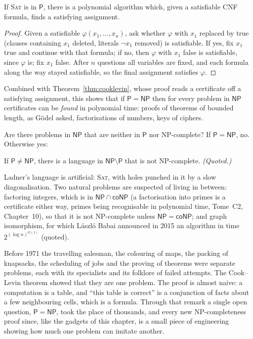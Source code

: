 \begin{proposition}\label{prop:selfreduce}
If \textup{\textsc{Sat}} is in $\mathsf P$, there is a polynomial algorithm which, given a satisfiable CNF formula, finds a satisfying assignment.
\end{proposition}

\begin{proof}
Given a satisfiable $\varphi(x_1,\dots,x_n)$, ask whether $\varphi$ with $x_1$ replaced by true (clauses containing $x_1$ deleted, literals $\neg x_1$ removed) is satisfiable. If yes, fix $x_1$ true and continue with that formula; if no, then $\varphi$ with $x_1$ false is satisfiable, since $\varphi$ is; fix $x_1$ false. After $n$ questions all variables are fixed, and each formula along the way stayed satisfiable, so the final assignment satisfies $\varphi$.
\end{proof}

Combined with Theorem~\ref{thm:cooklevin}, whose proof reads a certificate off a satisfying assignment, this shows that if $\mathsf P=\mathsf{NP}$ then for every problem in $\mathsf{NP}$ certificates can be \emph{found} in polynomial time: proofs of theorems of bounded length, as Gödel asked, factorisations of numbers, keys of ciphers.

Are there problems in $\mathsf{NP}$ that are neither in $\mathsf P$ nor NP-complete? If $\mathsf P=\mathsf{NP}$, no. Otherwise yes:

\begin{theorem}[Ladner 1975]\label{thm:ladner}
If $\mathsf P\ne\mathsf{NP}$, there is a language in $\mathsf{NP}\setminus\mathsf P$ that is not NP-complete. \emph{(Quoted.)}
\end{theorem}

Ladner's language is artificial: \textup{\textsc{Sat}}, with holes punched in it by a slow diagonalisation. Two natural problems are suspected of living in between: factoring integers, which is in $\mathsf{NP}\cap\mathsf{coNP}$ (a factorisation into primes is a certificate either way, primes being recognisable in polynomial time, Tome~C2, Chapter~10), so that it is not NP-complete unless $\mathsf{NP}=\mathsf{coNP}$; and graph isomorphism, for which László Babai announced in 2015 an algorithm in time $2^{(\log n)^{O(1)}}$ (quoted).

\begin{beauty}
Before 1971 the travelling salesman, the colouring of maps, the packing of knapsacks, the scheduling of jobs and the proving of theorems were separate problems, each with its specialists and its folklore of failed attempts. The Cook--Levin theorem showed that they are one problem. The proof is almost naive: a computation is a table, and ``this table is correct'' is a conjunction of facts about a few neighbouring cells, which is a formula. Through that remark a single open question, $\mathsf P=\mathsf{NP}$, took the place of thousands, and every new NP-completeness proof since, like the gadgets of this chapter, is a small piece of engineering showing how much one problem can imitate another.
\end{beauty}

